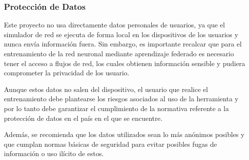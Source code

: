\subsubsection{Protección de Datos}
\label{subsubsec:ProteccionDatos}
Este proyecto no usa directamente datos personales de usuarios, ya que el simulador de red se ejecuta de forma local en los dispositivos de los usuarios y nunca envía información fuera. Sin embargo, es importante recalcar que para el entrenamiento de la red neuronal mediante aprendizaje federado es necesario tener el acceso a flujos de red, los cuales obtienen información sensible y pudiera comprometer la privacidad de los usuario.

Aunque estos datos no salen del dispositivo, el usuario que realice el entrenamiento debe plantearse los riesgos asociados al uso de la herramienta y por lo tanto debe garantizar el cumplimiento de la normativa referente a la protección de datos en el país en el que se encuentre.

Además, se recomienda que los datos utilizados sean lo más anónimos posibles y que cumplan normas básicas de seguridad para evitar posibles fugas de información o uso ilícito de estos.

